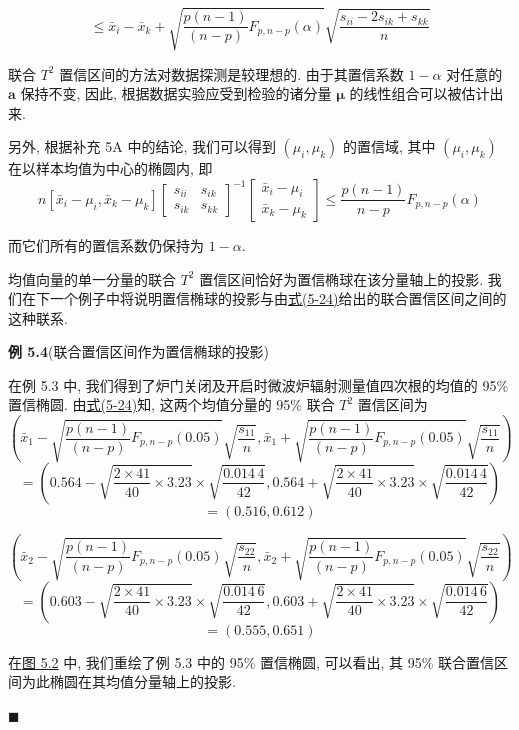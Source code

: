 \label{eq:5-25}
\begin{equation}
\le \bar{x}_{i}-\bar{x}_{k}+\sqrt{\frac{p(n-1)}{(n-p)}F_{p,n-p}(\alpha)}\sqrt{\frac{s_{ii}-2s_{ik}+s_{kk}}{n}} \tag{5-25}
\end{equation}

联合 $T^{2}$ 置信区间的方法对数据探测是较理想的. 由于其置信系数 $1-\alpha$ 对任意的 $\mathbf{a}$ 保持不变, 因此, 根据数据实验应受到检验的诸分量 $\boldsymbol{\mu}$ 的线性组合可以被估计出来.

另外, 根据补充 5A 中的结论, 我们可以得到 $(\mu_{i},\mu_{k})$ 的置信域, 其中 $(\mu_{i},\mu_{k})$ 在以样本均值为中心的椭圆内, 即
\label{eq:5-26}
\begin{equation}
n\left[\bar{x}_{i}-\mu_{i}, \bar{x}_{k}-\mu_{k}\right]\begin{bmatrix}s_{ii}&s_{ik}\\s_{ik}&s_{kk}\end{bmatrix}^{-1}\begin{bmatrix}\bar{x}_{i}-\mu_{i}\\\bar{x}_{k}-\mu_{k}\end{bmatrix}\le \frac{p(n-1)}{n-p}F_{p,n-p}(\alpha) \tag{5-26}
\end{equation}

而它们所有的置信系数仍保持为 $1-\alpha$.

均值向量的单一分量的联合 $T^{2}$ 置信区间恰好为置信椭球在该分量轴上的投影. 我们在下一个例子中将说明置信椭球的投影与由\hyperref[eq:5-24]{式(5-24)}给出的联合置信区间之间的这种联系.

\noindent\textbf{例 5.4}\quad (联合置信区间作为置信椭球的投影)

在例 5.3 中, 我们得到了炉门关闭及开启时微波炉辐射测量值四次根的均值的 95\% 置信椭圆. 由\hyperref[eq:5-24]{式(5-24)}知, 这两个均值分量的 95\% 联合 $T^{2}$ 置信区间为
\[
\left(\bar{x}_{1}-\sqrt{\frac{p(n-1)}{(n-p)}F_{p,n-p}(0.05)}\sqrt{\frac{s_{11}}{n}}, \bar{x}_{1}+\sqrt{\frac{p(n-1)}{(n-p)}F_{p,n-p}(0.05)}\sqrt{\frac{s_{11}}{n}}\right)
\]
\[
=\left(0.564-\sqrt{\frac{2\times41}{40}\times3.23}\times\sqrt{\frac{0.014\,4}{42}}, 0.564+\sqrt{\frac{2\times41}{40}\times3.23}\times\sqrt{\frac{0.014\,4}{42}}\right)
\]
\[
=(0.516,0.612)
\]

\[
\left(\bar{x}_{2}-\sqrt{\frac{p(n-1)}{(n-p)}F_{p,n-p}(0.05)}\sqrt{\frac{s_{22}}{n}}, \bar{x}_{2}+\sqrt{\frac{p(n-1)}{(n-p)}F_{p,n-p}(0.05)}\sqrt{\frac{s_{22}}{n}}\right)
\]
\[
=\left(0.603-\sqrt{\frac{2\times41}{40}\times3.23}\times\sqrt{\frac{0.014\,6}{42}}, 0.603+\sqrt{\frac{2\times41}{40}\times3.23}\times\sqrt{\frac{0.014\,6}{42}}\right)
\]
\[
=(0.555,0.651)
\]

在\hyperref[fig:5.2]{图 5.2} 中, 我们重绘了例 5.3 中的 95\% 置信椭圆, 可以看出, 其 95\% 联合置信区间为此椭圆在其均值分量轴上的投影.

\begin{mvfigure}
\label{fig:5.2}
\end{mvfigure}
\hfill$\blacksquare$
